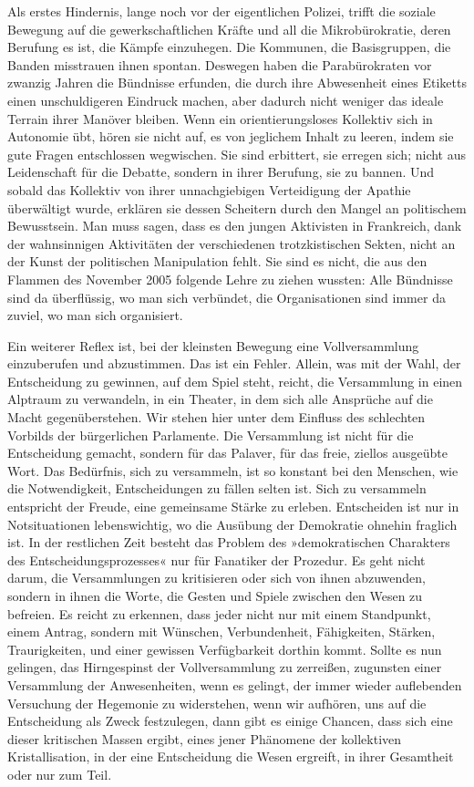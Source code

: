 Als erstes Hindernis, lange noch vor der eigentlichen Polizei,
trifft die soziale Bewegung auf die gewerkschaftlichen Kräfte und
all die Mikrobürokratie, deren Berufung es ist, die Kämpfe
einzuhegen. Die Kommunen, die Basisgruppen, die Banden misstrauen
ihnen spontan. Deswegen haben die Parabürokraten vor zwanzig Jahren
die Bündnisse erfunden, die durch ihre Abwesenheit eines Etiketts
einen unschuldigeren Eindruck machen, aber dadurch nicht weniger
das ideale Terrain ihrer Manöver bleiben. Wenn ein
orientierungsloses Kollektiv sich in Autonomie übt, hören sie nicht
auf, es von jeglichem Inhalt zu leeren, indem sie gute Fragen
entschlossen wegwischen. Sie sind erbittert, sie erregen sich;
nicht aus Leidenschaft für die Debatte, sondern in ihrer Berufung,
sie zu bannen. Und sobald das Kollektiv von ihrer unnachgiebigen
Verteidigung der Apathie überwältigt wurde, erklären sie dessen
Scheitern durch den Mangel an politischem Bewusstsein. Man muss
sagen, dass es den jungen Aktivisten in Frankreich, dank der
wahnsinnigen Aktivitäten der verschiedenen trotzkistischen Sekten,
nicht an der Kunst der politischen Manipulation fehlt. Sie sind es
nicht, die aus den Flammen des November 2005 folgende Lehre zu
ziehen wussten: Alle Bündnisse sind da überflüssig, wo man sich
verbündet, die Organisationen sind immer da zuviel, wo man sich
organisiert.
\extrapar{}

Ein weiterer Reflex ist, bei der kleinsten Bewegung eine
Vollversammlung einzuberufen und abzustimmen. Das ist ein Fehler.
Allein, was mit der Wahl, der Entscheidung zu gewinnen, auf dem
Spiel steht, reicht, die Versammlung in einen Alptraum zu
verwandeln, in ein Theater, in dem sich alle Ansprüche auf die
Macht gegenüberstehen. Wir stehen hier unter dem Einfluss des
schlechten Vorbilds der bürgerlichen Parlamente. Die Versammlung
ist nicht für die Entscheidung gemacht, sondern für das Palaver,
für das freie, ziellos ausgeübte Wort.
Das Bedürfnis, sich zu versammeln, ist so konstant bei den
Menschen, wie die Notwendigkeit, Entscheidungen zu fällen selten
ist. Sich zu versammeln entspricht der Freude, eine gemeinsame
Stärke zu erleben. Entscheiden ist nur in Notsituationen
lebenswichtig, wo die Ausübung der Demokratie ohnehin fraglich ist.
In der restlichen Zeit besteht das Problem des »demokratischen
Charakters des Entscheidungsprozesses« nur für Fanatiker der
Prozedur. Es geht nicht darum, die Versammlungen zu kritisieren
oder sich von ihnen abzuwenden, sondern in ihnen die Worte, die
Gesten und Spiele zwischen den Wesen zu befreien. Es reicht zu
erkennen, dass jeder nicht nur mit einem Standpunkt, einem Antrag,
sondern mit Wünschen, Verbundenheit, Fähigkeiten, Stärken,
Traurigkeiten, und einer gewissen Verfügbarkeit dorthin kommt.
Sollte es nun gelingen, das Hirngespinst der Vollversammlung zu
zerreißen, zugunsten einer Versammlung der Anwesenheiten, wenn es
gelingt, der immer wieder auflebenden Versuchung der Hegemonie zu
widerstehen, wenn wir aufhören, uns auf die Entscheidung als Zweck
festzulegen, dann gibt es einige Chancen, dass sich eine dieser
kritischen Massen ergibt, eines jener Phänomene der kollektiven
Kristallisation, in der eine Entscheidung die Wesen ergreift, in
ihrer Gesamtheit oder nur zum Teil.

